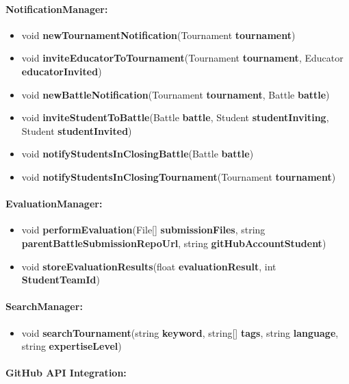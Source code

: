 \documentclass{article}
\begin{document}
\paragraph{NotificationManager:}

\begin{itemize}
    \item void \textbf{newTournamentNotification}(Tournament \textbf{tournament})
    \item void \textbf{inviteEducatorToTournament}(Tournament \textbf{tournament}, Educator \textbf{educatorInvited})
    \item void \textbf{newBattleNotification}(Tournament \textbf{tournament}, Battle \textbf{battle})
    \item void \textbf{inviteStudentToBattle}(Battle \textbf{battle}, Student \textbf{studentInviting}, Student \textbf{studentInvited})
    \item void \textbf{notifyStudentsInClosingBattle}(Battle \textbf{battle})
    \item void \textbf{notifyStudentsInClosingTournament}(Tournament \textbf{tournament})
\end{itemize}

\paragraph{EvaluationManager:}

\begin{itemize}
    \item void \textbf{performEvaluation}(File[] \textbf{submissionFiles}, string \textbf{parentBattleSubmissionRepoUrl}, string \textbf{gitHubAccountStudent})
    \item void \textbf{storeEvaluationResults}(float \textbf{evaluationResult}, int \textbf{StudentTeamId})
\end{itemize}

\paragraph{SearchManager:}

\begin{itemize}
    \item void \textbf{searchTournament}(string \textbf{keyword}, string[] \textbf{tags}, string \textbf{language}, string \textbf{expertiseLevel})
\end{itemize}

\paragraph{GitHub API Integration:}
\end{document}
